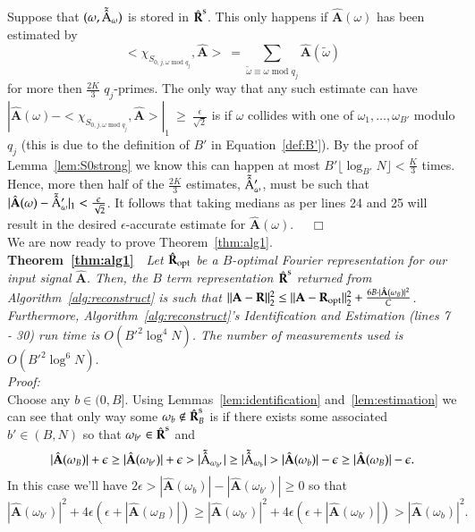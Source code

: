 \documentclass{article}
\begin{document}
Suppose that $(\omega, \tilde{\hat{{\rm A}}}_{\omega})$ is stored in $\hat{\textbf{R}}^{\rm s}$.  This only happens if $\hat{\textbf{A}}(\omega)$ has been estimated by $$<\chi_{S_{0,j,\omega \textrm{ mod } q_{j}}},\hat{\textbf{A}}> ~= \sum_{\tilde{\omega} \equiv \omega \textrm{ mod } q_{j}} \hat{\textbf{A}}(\tilde{\omega})$$ for more then $\frac{2K}{3}$ $q_{j}$-primes.  The only way that any such estimate can have $|\hat{\textbf{A}}(\omega) - <\chi_{S_{0,j,\omega \textrm{ mod } q_{j}}},\hat{\textbf{A}}>|_{1} ~\geq~ \frac{\epsilon}{\sqrt{2}}$ is if $\omega$ collides with one of $\omega_{1}, \dots, \omega_{B'}$ modulo $q_{j}$ (this is due to the definition of $B'$ in Equation~\ref{def:B'}).  By the proof of Lemma~\ref{lem:S0strong} we know this can happen at most $B' \lfloor \log_{B'} N \rfloor < \frac{K}{3}$ times.  Hence, more then half of the $\frac{2K}{3}$ estimates, $\tilde{\hat{{\rm A}}}_{\omega}'$, must be such that $|\hat{\textbf{A}}(\omega) - \tilde{\hat{{\rm A}}}_{\omega}'|_{1} < \frac{\epsilon}{\sqrt{2}}$.  It follows that taking medians as per lines 24 and 25 will result in the desired $\epsilon$-accurate estimate for $\hat{\textbf{A}}(\omega)$.
~~$\Box$ \\

We are now ready to prove Theorem~\ref{thm:alg1}.\\

\noindent \textbf{Theorem~\ref{thm:alg1}}~~\textit{Let $\hat{\textbf{R}}_{\rm opt}$ be a $B$-optimal Fourier representation for our input signal $\hat{\textbf{A}}$.  Then, the $B$ term representation $\hat{\textbf{R}}^{\rm s}$ returned from Algorithm~\ref{alg:reconstruct} is such that $\| \textbf{A} - \textbf{R} \|^{2}_{2} \leq \| \textbf{A} - \textbf{R}_{\rm opt} \|^{2}_{2} + \frac{6 B \cdot |\hat{\textbf{A}}(\omega_{B})|^{2}}{C}$.  Furthermore, Algorithm~\ref{alg:reconstruct}'s Identification and Estimation (lines 7 - 30) run time is $O(B'^{2} \log^{4} N )$.  The number of measurements used is $O( B'^{2} \log^{6} N )$}.\\

\noindent \textit{Proof:}\\

Choose any $b \in (0,B]$.  Using Lemmas~\ref{lem:identification} and~\ref{lem:estimation} we can see that only way some $\omega_{b} \notin \hat{\textbf{R}}^{\rm s}_{B}$ is if there exists some associated $b' \in (B,N)$ so that $\omega_{b'} \in \hat{\textbf{R}}^{\rm s}$ and
$$| \hat{\textbf{A}}(\omega_{B}) | + \epsilon \geq | \hat{\textbf{A}}(\omega_{b'}) | + \epsilon > | \tilde{\hat{{\rm A}}}_{\omega_{b'}}| \geq | \tilde{\hat{{\rm A}}}_{\omega_{b}} | > | \hat{\textbf{A}}(\omega_{b}) | - \epsilon \geq | \hat{\textbf{A}}(\omega_{B}) | - \epsilon.$$ 
In this case we'll have $2 \epsilon > | \hat{\textbf{A}}(\omega_{b}) | - | \hat{\textbf{A}}(\omega_{b'}) | \geq 0$ so that
\begin{equation}
| \hat{\textbf{A}}(\omega_{b'}) |^{2} + 4 \epsilon \left(  \epsilon + | \hat{\textbf{A}}(\omega_{B}) | \right) \geq | \hat{\textbf{A}}(\omega_{b'}) |^{2} + 4 \epsilon \left(  \epsilon + | \hat{\textbf{A}}(\omega_{b'}) | \right) > | \hat{\textbf{A}}(\omega_{b}) |^{2}.
\label{eqn:proofe}
\end{equation}
\end{document}
